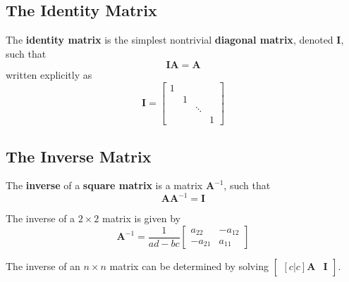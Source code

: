 \documentclass{article}
\begin{document}
\subsection{The Identity Matrix}
\begin{definition}
    The \textbf{identity matrix} is the simplest nontrivial
    \textbf{diagonal matrix}, denoted \(\symbf{I}\), such that
    \begin{equation*}
        \symbf{I} \symbf{A} = \symbf{A}
    \end{equation*}
    written explicitly as
    \begin{equation*}
        \symbf{I} =
        \begin{bmatrix}
            1 &   &        &   \\
              & 1 &        &   \\
              &   & \ddots &   \\
              &   &        & 1
        \end{bmatrix}
    \end{equation*}
\end{definition}
\subsection{The Inverse Matrix}
\begin{definition}
    The \textbf{inverse} of a \textbf{square matrix} is a matrix
    \(\symbf{A}^{-1}\), such that
    \begin{equation*}
        \symbf{A} \symbf{A}^{-1} = \symbf{I}
    \end{equation*}
\end{definition}
\begin{theorem}
    The inverse of a \(2\times 2\) matrix is given by
    \begin{equation*}
        \symbf{A}^{-1} = \frac{1}{ad-bc}
        \begin{bmatrix}
            a_{22}  & -a_{12} \\
            -a_{21} & a_{11}
        \end{bmatrix}
    \end{equation*}
\end{theorem}
\begin{theorem}
    The inverse of an \(n\times n\) matrix can be determined by solving
    \(
    \begin{bmatrix}[c|c]
        \symbf{A} & \symbf{I}
    \end{bmatrix}
    \).
\end{theorem}
\end{document}
